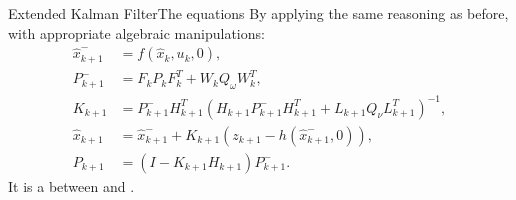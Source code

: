 \begin{frame}{Extended Kalman Filter}{The equations}
  By applying the same reasoning as before, with appropriate algebraic manipulations:
  \begin{subequations}
    \begin{align}
      \hat{x}_{k+1}^{-} &= f(\hat{x}_k,u_k,0),\\
      P_{k+1}^{-} &= F_kP_kF_k^T + W_kQ_{\omega}W_k^T,\\
      K_{k+1} &= P_{k+1}^{-}H_{k+1}^T(H_{k+1}P_{k+1}^{-}H_{k+1}^T + L_{k+1}Q_{\nu}L_{k+1}^T)^{-1},\\
      \hat{x}_{k+1} &= \hat{x}_{k+1}^{-} + K_{k+1}(z_{k+1} - h(\hat{x}_{k+1}^{-},0)),\\
      P_{k+1} &= (I - K_{k+1}H_{k+1})P_{k+1}^{-}.
    \end{align}
  \end{subequations}
  It is a  between  and .
\end{frame}

